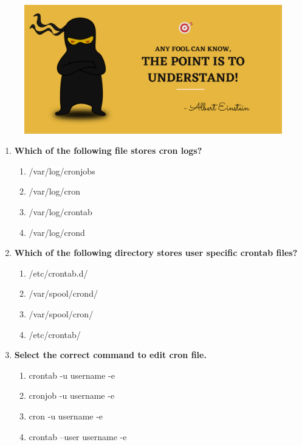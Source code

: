 \setlength{\columnsep}{3pt}
\begin{flushleft}
	
	\paragraph{}
	\bigskip
	
	\begin{figure}[h!]
		\centering
		\includegraphics[scale=.2]{content/practise.jpg}
	\end{figure}	
	\begin{enumerate}
		
		\item \textbf{Which of the following file stores cron logs?}
		\begin{enumerate}[label=(\alph*)]
			\item /var/log/cronjobs
			\item /var/log/cron %
			\item /var/log/crontab
			\item /var/log/crond
		\end{enumerate}
		\bigskip
		\bigskip
		
		\item \textbf{Which of the following directory stores user specific crontab files?}
		\begin{enumerate}[label=(\alph*)]
			\item /etc/crontab.d/
			\item /var/spool/crond/
			\item /var/spool/cron/  %
			\item /etc/crontab/
		\end{enumerate}
		\bigskip
		\bigskip	
		
		\item \textbf{Select the correct command to edit cron file.}
		\begin{enumerate}[label=(\alph*)]
			\item crontab -u username -e %
			\item cronjob -u username -e
			\item cron -u username -e
			\item crontab --user username -e
		\end{enumerate}
		\bigskip
		\bigskip	


\end{enumerate}
\end{flushleft}
